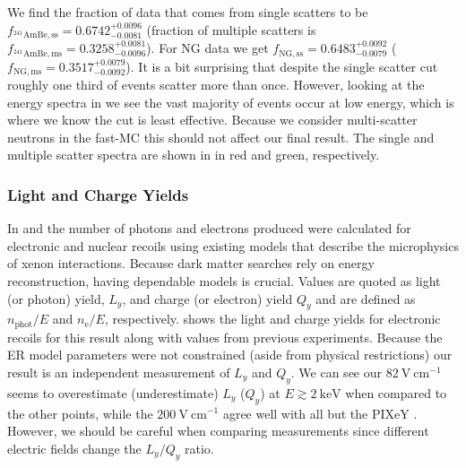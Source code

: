 We find the fraction of \ambe data that comes from single scatters to be $f_{\mathrm{^{241}AmBe, ss}} = 0.6742_{-0.0081}^{+0.0096}$
(fraction of multiple scatters is $f_{\mathrm{^{241}AmBe, ms}} = 0.3258_{-0.0096}^{+0.0081}$).  For NG data we get
$f_{\mathrm{NG, ss}} = 0.6483_{-0.0079}^{+0.0092}$ ($f_{\mathrm{NG, ms}} = 0.3517_{-0.0092}^{+0.0079}$).  It is a bit surprising that
despite the single scatter cut roughly one third of events scatter more than once.  However, looking at the energy spectra in
 we see the vast majority of events occur at low energy, which is where
we know the cut is least effective.  Because we consider multi-scatter neutrons in the fast-MC this should not affect our final
result.  The single and multiple scatter spectra are shown in  in red and green,
respectively.



\subsubsection{Light and Charge Yields}
\label{subsubsec:er_nr_calibrations_results_ly_qy}
In  and  the number
of photons and electrons produced were calculated for electronic and nuclear recoils using existing models that describe
the microphysics of xenon interactions.  Because dark matter searches rely on energy reconstruction, having dependable models is
crucial.  Values are quoted as light (or photon) yield, $L_y$, and charge (or electron) yield $Q_y$ and are defined as
$n_{\mathrm{phot}}/E$ and $n_{\mathrm{e}} / E$, respectively.   shows the light and
charge yields for electronic recoils for this result along with values from previous experiments.  Because the ER model parameters were
not constrained (aside from physical restrictions) our result is an independent measurement of $L_y$ and $Q_y$.  We
can see our $82\ \mathrm{V\ cm^{-1}}$ seems to overestimate (underestimate) $L_y$ ($Q_y$) at $E \gtrsim 2\ \mathrm{keV}$ when compared to the
other points, while the $200\ \mathrm{V\ cm^{-1}}$ agree well with all but the PIXeY .  However, we should be careful when
comparing measurements since different electric fields change the $L_y/Q_y$ ratio.

